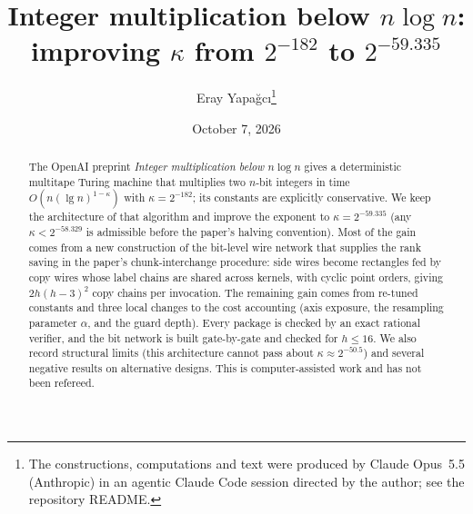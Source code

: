 \documentclass[11pt]{article}
\title{Integer multiplication below $n\log n$:\\ improving $\kappa$ from $2^{-182}$ to $2^{-59.335}$}
\author{Eray Yapağcı\thanks{The constructions, computations and text were produced by Claude Opus~5.5 (Anthropic) in an agentic Claude Code session directed by the author; see the repository README.}}
\date{October 7, 2026}
\theoremstyle{remark}
\newcommand{\lgn}{\lg n}
\begin{document}
\maketitle

\begin{abstract}
The OpenAI preprint \emph{Integer multiplication below $n\log n$} \cite{OAI} gives a deterministic multitape Turing machine that multiplies two $n$-bit integers in time $O(n(\lgn)^{1-\kappa})$ with $\kappa = 2^{-182}$; its constants are explicitly conservative. We keep the architecture of that algorithm and improve the exponent to $\kappa = 2^{-59.335}$ (any $\kappa < 2^{-58.329}$ is admissible before the paper's halving convention). Most of the gain comes from a new construction of the bit-level wire network that supplies the rank saving in the paper's chunk-interchange procedure: side wires become rectangles fed by copy wires whose label chains are shared across kernels, with cyclic point orders, giving $2h(h-3)^2$ copy chains per invocation. The remaining gain comes from re-tuned constants and three local changes to the cost accounting (axis exposure, the resampling parameter $\alpha$, and the guard depth). Every package is checked by an exact rational verifier, and the bit network is built gate-by-gate and checked for $h \le 16$. We also record structural limits (this architecture cannot pass about $\kappa \approx 2^{-50.5}$) and several negative results on alternative designs. This is computer-assisted work and has not been refereed.
\end{abstract}

\tableofcontents











\end{document}
